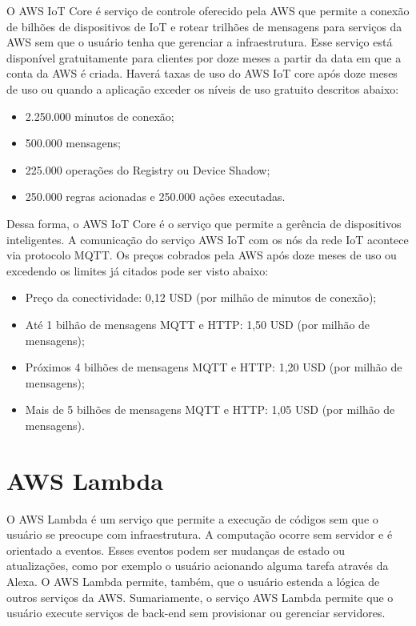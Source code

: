 O AWS IoT Core é serviço de controle oferecido pela AWS que permite a conexão de bilhões de dispositivos de IoT e rotear trilhões de mensagens para serviços da AWS sem que o usuário tenha que gerenciar a infraestrutura. Esse serviço está disponível gratuitamente para clientes por doze meses a partir da data em que a conta da AWS é criada. Haverá taxas de uso do AWS IoT core após doze meses de uso ou quando a aplicação exceder os níveis de uso gratuito descritos abaixo:

\begin{itemize}
	\item 2.250.000 minutos de conexão;
	\item 500.000 mensagens;
	\item 225.000 operações do Registry ou Device Shadow;
	\item 250.000 regras acionadas e 250.000 ações executadas.
\end{itemize}

Dessa forma, o AWS IoT Core é o serviço que permite a gerência de dispositivos inteligentes. A comunicação do serviço AWS IoT com os nós da rede IoT acontece via protocolo MQTT. Os preços cobrados pela AWS após doze meses de uso ou excedendo os limites já citados pode ser visto abaixo:

\begin{itemize}
	\item Preço da conectividade: 0,12 USD (por milhão de minutos de conexão);
	\item Até 1 bilhão de mensagens MQTT e HTTP: 1,50 USD (por milhão de mensagens);
	\item Próximos 4 bilhões de mensagens MQTT e HTTP: 1,20 USD (por milhão de mensagens);
	\item Mais de 5 bilhões de mensagens MQTT e HTTP: 1,05 USD (por milhão de mensagens).
\end{itemize}

\section{AWS Lambda}\label{section:aws_lambda}

O AWS Lambda é um serviço que permite a execução de códigos sem que o usuário se preocupe com infraestrutura. A computação ocorre sem servidor e é orientado a eventos. Esses eventos podem ser mudanças de estado ou atualizações, como por exemplo o usuário acionando alguma tarefa através da Alexa. O AWS Lambda permite, também, que o usuário estenda a lógica de outros serviços da AWS. Sumariamente, o serviço AWS Lambda permite que o usuário execute serviços de back-end sem provisionar ou gerenciar servidores.

